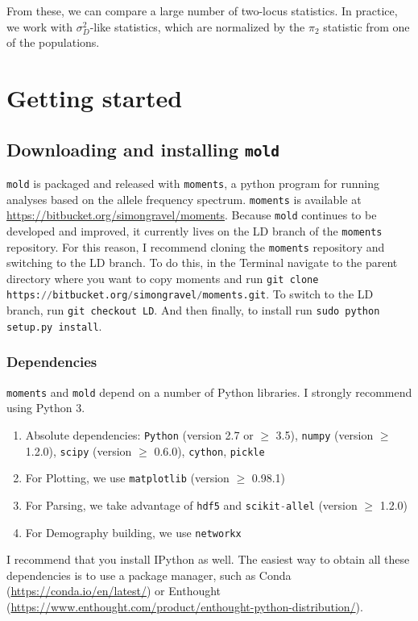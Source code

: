 \documentclass[10pt]{article}
\makeatletter
\renewcommand{\cite}{\citep}
\newcommand{\mold}{\texttt{mold}\xspace}
\newcommand{\py}[1]{\lstinline[breaklines=true,language=Python, showstringspaces=False]@#1@}
\makeatother
\begin{document}
From these, we can compare a large number of two-locus statistics.
In practice, we work with $\sigma_D^2$-like statistics, which are normalized by the $\pi_2$ statistic from one of the populations.


\section{Getting started}

\subsection{Downloading and installing \mold}

\mold is packaged and released with \py{moments}, a python program for running analyses based on the allele frequency spectrum.
\py{moments} is available at \url{https://bitbucket.org/simongravel/moments}.
Because \mold continues to be developed and improved, it currently lives on the LD branch of the \py{moments} repository.
For this reason, I recommend cloning the \py{moments} repository and switching to the LD branch.
To do this, in the Terminal navigate to the parent directory where you want to copy moments and run
\py{git clone https://bitbucket.org/simongravel/moments.git}.
To switch to the LD branch, run
\py{git checkout LD}.
And then finally, to install run
\py{sudo python setup.py install}.

\subsubsection{Dependencies}

\py{moments} and \mold depend on a number of Python libraries. I strongly recommend using Python 3.

\begin{enumerate}
\item Absolute dependencies: \py{Python} (version 2.7 or $\geq$ 3.5), \py{numpy} (version $\geq$ 1.2.0), \py{scipy} (version $\geq$ 0.6.0), \py{cython}, \py{pickle}
\item For Plotting, we use \py{matplotlib} (version $\geq$ 0.98.1)
\item For Parsing, we take advantage of \py{hdf5} and \py{scikit-allel} (version $\geq$ 1.2.0) \cite{}
\item For Demography building, we use \py{networkx}
\end{enumerate}

I recommend that you install IPython as well.
The easiest way to obtain all these dependencies is to use a package manager, such as Conda (\url{https://conda.io/en/latest/}) or Enthought (\url{https://www.enthought.com/product/enthought-python-distribution/}).
\end{document}
